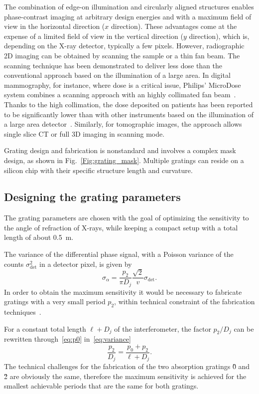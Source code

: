 The combination of edge-on illumination and circularly aligned structures
enables phase-contrast imaging at arbitrary design energies and with a
maximum field of view in the horizontal direction ($x$ direction). These
advantages come at the expense of a limited field of view in the vertical
direction ($y$ direction), which is, depending on the X-ray detector,
typically a few pixels. However, radiographic 2D imaging can be obtained by
scanning the sample or a thin fan beam. The scanning technique has been
demonstrated to deliver less dose than the conventional approach based on
the illumination of a large area. In digital mammography, for instance,
where dose is a critical issue, Philips' MicroDose system combines a
scanning approach with an highly collimated fan beam~\parencite{Aslund2007}.
Thanks to the high collimation, the dose deposited on  patients has been
reported to be significantly lower than with other instruments based on the
illumination of a large area detector~\parencite{Oduko2010}. Similarly, for
tomographic images, the approach allows single slice \ac{CT} or full 3D
imaging in scanning mode.

Grating design and fabrication is nonstandard and involves a complex mask
design, as shown in Fig.~\ref{Fig:grating_mask}. Multiple gratings can
reside on a silicon chip with their specific structure length and curvature.

\subsection{Designing the grating parameters}
The grating parameters are chosen with the goal of optimizing the
sensitivity to the angle of refraction of X-rays, while keeping a compact
setup with a total length of about \SI{0.5}{\meter}.

The variance of the differential phase signal, with a Poisson variance of
the counts $\sigma_{\text{det}}^2$ in a detector pixel, is given by~\parencite{Raupach2011}
\begin{equation}
    \sigma_\alpha = \frac{p_2}{\pi D_j}
    \frac{\sqrt{2}}{v}\sigma_{\text{det}}.\label{eq:variance}
\end{equation}
In order to obtain the maximum sensitivity it would be necessary to
fabricate gratings with a very small period
$p_2$, within technical constraint of the fabrication
techniques~\parencite{David2007,Kenntner2010}.

For a constant total length $\ell + D_j$ of the interferometer, the factor
$p_2/D_j$ can be rewritten through~\eqref{eq:p0} in~\eqref{eq:variance}
\begin{equation}
    \frac{p_2}{D_j} = \frac{p_0 + p_2}{\ell + D_j}.
\end{equation}
The technical challenges for the fabrication of the two absorption gratings
\G0 and \G2 are obviously the same, therefore the maximum sensitivity is
achieved for the smallest achievable periods that are the same for both
gratings.

